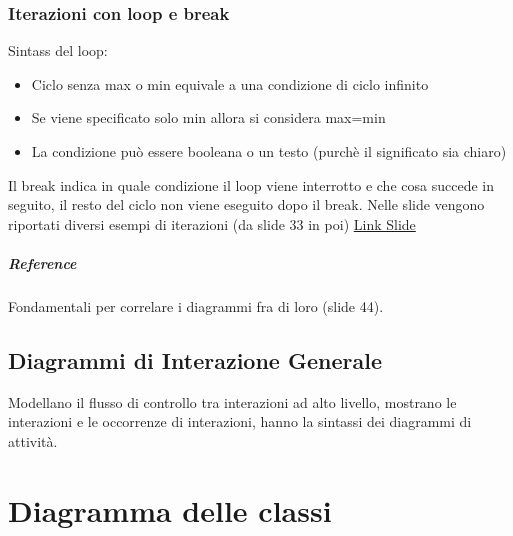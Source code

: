 \subsection*{Iterazioni con loop e break}
Sintass del loop:
\begin{itemize}
    \item Ciclo senza max o min equivale a una condizione di ciclo infinito
    \item Se viene specificato solo min allora si considera max=min
    \item La condizione può essere booleana o un testo (purchè il significato sia chiaro)
\end{itemize}
Il break indica in quale condizione il loop viene interrotto e che cosa succede in seguito,
il resto del ciclo non viene eseguito dopo il break.
Nelle slide vengono riportati diversi esempi di iterazioni (da slide 33 in poi) \href{https://elearning.unimib.it/pluginfile.php/1463483/mod_resource/content/2/10_Diagrammi%20di%20interazione.pdf}{Link Slide}
\paragraph*{Reference} Fondamentali per correlare i diagrammi fra di loro (slide 44).
\section{Diagrammi di Interazione Generale}
Modellano il flusso di controllo tra interazioni ad alto livello, mostrano le interazioni
e le occorrenze di interazioni, hanno la sintassi dei diagrammi di attività.

\chapter{Diagramma delle classi}